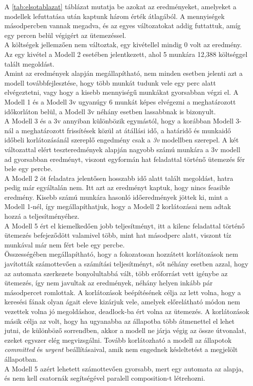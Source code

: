 \documentclass {report}
\begin{document}
   A \ref{tab:elsotablazat} táblázat mutatja be azokat az eredményeket, amelyeket a modellek lefuttatása után kaptunk három érték átlagából. A mennyiségek másodpercben vannak megadva, és az egyes változatokat addig futtattuk, amíg egy percen belül végigért az ütemezéssel.\\
   A költségek jellemzően nem változtak, egy kivétellel mindig 0 volt az eredmény. Az egy kivétel a Modell 2 esetében jelentkezett, ahol 5 munkára 12,388 költséggel talált megoldást.\\
   Amint az eredmények alapján megállapítható, nem minden esetben jelenti azt a modell továbbfejlesztése, hogy több munkát tudunk vele egy perc alatt elvégeztetni, vagy hogy a kisebb mennyiségű munkákat gyorsabban végzi el. A Modell 1 és a Modell 3v ugyanúgy 6 munkát képes elvégezni a meghatározott időkorláton belül, a Modell 3v néhány esetben lassabbnak is bizonyult.\\
   A Modell 3 és a 3v annyiban különbözik egymástól, hogy a korábban Modell 3-nál a meghatározott frissítések közül at átállási idő, a határidő és munkaidő időbeli korlátozásánál szereplő engedmény csak a \emph{3v} modellben szerepel. A két változattal elért teszteredmények alapján nagyobb számú munkára a 3v modell ad gyorsabban eredményt, viszont egyformán hat feladattal történő ütemezés fér bele egy percbe.\\
   A Modell 2 öt feladatra jelentősen hosszabb idő alatt talált megoldást, hatra pedig már egyáltalán nem. Itt azt az eredményt kaptuk, hogy nincs feasible eredmény. Kisebb számú munkára hasonló időeredmények jöttek ki, mint a Modell 1-nél, így megállapíthatjuk, hogy a Modell 2 korlátozásai nem adtak hozzá a teljesítményéhez. \\
   A Modell 5 ért el kiemelkedően jobb teljesítményt, itt a kilenc feladattal történő ütemezés befejeződött valamivel több, mint hat másodperc alatt, viszont tíz munkával már nem fért bele egy percbe.\\
   Összességében megállapítható, hogy a fokozatosan hozzátett korlátozások nem javították számottevően a számítási teljesítményt, sőt néhány esetben azzal, hogy az automata szerkezete bonyolultabbá vált, több erőforrást vett igénybe az ütemezés, így nem javultak az eredmények, néhány helyen inkább pár másodpercet romlottak. A korlátozások beépítésének célja az lett volna, hogy a keresési fának olyan ágait eleve kizárjuk vele, amelyek előrelátható módon nem vezettek volna jó megoldáshoz, deadlock-ba ért volna az ütemezés. A korlátozások másik célja az volt, hogy ha ugyanabba az állapotba több átmenettel el lehet jutni, de különböző sorrendben, akkor a modell ne járja végig az össze útvonalat, ezeket egyszer elég megvizsgálni. Tovább korlátozható a modell az állapotok \emph{committed} és \emph{urgent} beállításaival, amik nem engednek késleltetést a megjelölt állapotban.\\ 
   A Modell 5 azért lehetett számottevően gyorsabb, mert egy automata az alapja, és nem kell csatornák segítségével paralell composition-t létrehozni. 
\end{document}

